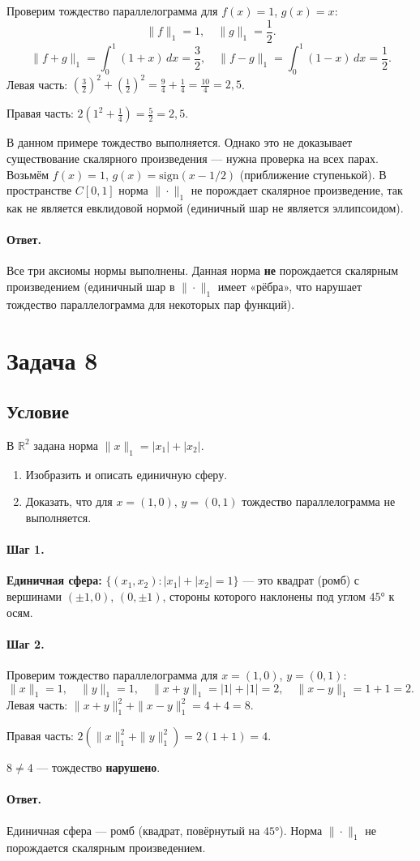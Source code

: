\documentclass[12pt,a4paper]{article}
\theoremstyle{solution}
\newcommand{\task}[1]{\newpage\section*{Задача #1}}
\newcommand{\answer}{\paragraph{Ответ.}}
\newcommand{\step}[1]{\paragraph{Шаг #1.}}
\newcommand{\R}{\mathbb{R}}
\begin{document}
Проверим тождество параллелограмма для $f(x)=1$, $g(x)=x$:
\[
\|f\|_1=1,\quad\|g\|_1=\frac{1}{2}.
\]
\[
\|f+g\|_1=\int_0^1(1+x)\,dx=\frac{3}{2},\quad
\|f-g\|_1=\int_0^1(1-x)\,dx=\frac{1}{2}.
\]
Левая часть: $\left(\frac{3}{2}\right)^2+\left(\frac{1}{2}\right)^2=\frac{9}{4}+\frac{1}{4}=\frac{10}{4}=2{,}5$.

Правая часть: $2\left(1^2+\frac{1}{4}\right)=\frac{5}{2}=2{,}5$.

В данном примере тождество выполняется. Однако это не доказывает существование скалярного произведения --- нужна проверка на всех парах. Возьмём $f(x)=1$, $g(x)=\mathrm{sign}(x-1/2)$ (приближение ступенькой). В пространстве $C[0,1]$ норма $\|\cdot\|_1$ не порождает скалярное произведение, так как не является евклидовой нормой (единичный шар не является эллипсоидом).

\answer Все три аксиомы нормы выполнены. Данная норма \textbf{не} порождается скалярным произведением (единичный шар в $\|\cdot\|_1$ имеет «рёбра», что нарушает тождество параллелограмма для некоторых пар функций).

\task{8}
\subsection*{Условие}
В $\R^2$ задана норма $\|x\|_1=|x_1|+|x_2|$.
\begin{enumerate}
\item Изобразить и описать единичную сферу.
\item Доказать, что для $x=(1,0)$, $y=(0,1)$ тождество параллелограмма не выполняется.
\end{enumerate}

\step{1} \textbf{Единичная сфера:} $\{(x_1,x_2):|x_1|+|x_2|=1\}$ --- это квадрат (ромб) с вершинами $(\pm1,0)$, $(0,\pm1)$, стороны которого наклонены под углом $45°$ к осям.

\step{2} Проверим тождество параллелограмма для $x=(1,0)$, $y=(0,1)$:
\[
\|x\|_1=1,\quad\|y\|_1=1,\quad\|x+y\|_1=|1|+|1|=2,\quad\|x-y\|_1=1+1=2.
\]
Левая часть: $\|x+y\|_1^2+\|x-y\|_1^2=4+4=8$.

Правая часть: $2(\|x\|_1^2+\|y\|_1^2)=2(1+1)=4$.

$8\neq4$ --- тождество \textbf{нарушено}.

\answer Единичная сфера --- ромб (квадрат, повёрнутый на $45°$). Норма $\|\cdot\|_1$ не порождается скалярным произведением.
\end{document}
